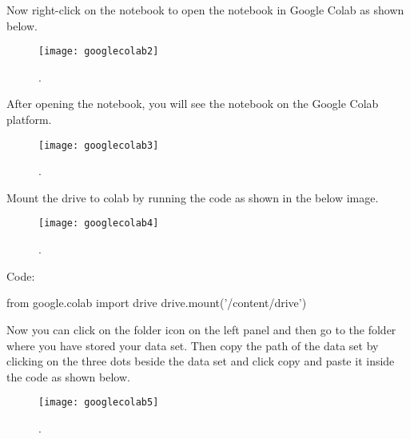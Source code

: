 Now right-click on the notebook to open the notebook in Google Colab as shown below.

	\begin{figure}[h]
		\centering
		\texttt{[image: googlecolab2]}
		\caption{.}
		\label{fig:googlecolab2}
	\end{figure}

After opening the notebook, you will see the notebook on the Google Colab platform.

	\begin{figure}[h]
		\centering
		\texttt{[image: googlecolab3]}
		\caption{.}
		\label{fig:googlecolab3}
	\end{figure}

Mount the drive to colab by running the code as shown in the below image.
 
 	\begin{figure}[h]
		\centering
		\texttt{[image: googlecolab4]}
		\caption{.}
		\label{fig:googlecolab4}
	\end{figure}

Code:

from google.colab import drive
drive.mount('/content/drive')

Now you can click on the folder icon on the left panel and then go to the folder where you have stored your data set. Then copy the path of the data set by clicking on the three dots beside the data set and click copy and paste it inside the code as shown below.

 	\begin{figure}[h]
		\centering
		\texttt{[image: googlecolab5]}
		\caption{.}
		\label{fig:googlecolab5}
	\end{figure}